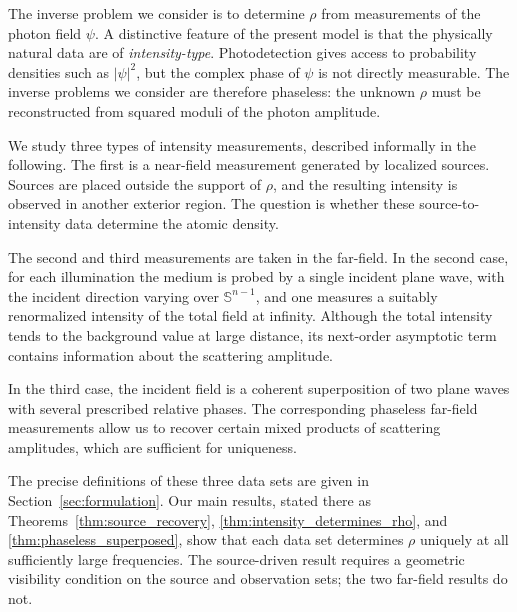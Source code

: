 \documentclass[12pt,a4paper]{amsart}
\numberwithin{equation}{section}
\theoremstyle{plain}
\theoremstyle{definition}
\begin{document}
The inverse problem we consider is to determine $\rho$ from measurements of the
photon field $\psi$. A distinctive feature of the present model is that
the physically natural data are of \emph{intensity-type}. Photodetection
gives access to probability densities such as $|\psi|^2$, but the complex
phase of $\psi$ is not directly measurable. The inverse problems we
consider are therefore phaseless: the unknown $\rho$ must be reconstructed
from squared moduli of the photon amplitude.

We study three types of intensity measurements, described informally in the following. The first is a near-field measurement generated by localized sources. Sources are placed outside the
support of $\rho$, and the resulting intensity is observed in another
exterior region. The question is whether these source-to-intensity data
determine the atomic density.

The second and third measurements are taken in the far-field. In the second case, for each illumination the medium is probed by a single incident
plane wave, with the incident direction varying over $\mathbb{S}^{n-1}$, and one measures a suitably renormalized intensity of the total field at infinity. Although the total intensity tends to the background value at large distance,
its next-order asymptotic term contains information about the scattering
amplitude.

In the third case, the incident field is a coherent superposition of two plane
waves with several prescribed relative phases. The corresponding phaseless
far-field measurements allow us to recover certain mixed products of scattering
amplitudes, which are sufficient for uniqueness.


The precise definitions of these three data sets are given in
Section~\ref{sec:formulation}. Our main results, stated there as
Theorems~\ref{thm:source_recovery},
\ref{thm:intensity_determines_rho}, and
\ref{thm:phaseless_superposed}, show that each data set determines
$\rho$ uniquely at all sufficiently large frequencies. The source-driven
result requires a geometric visibility condition on the source and
observation sets; the two far-field results do not.
\end{document}
